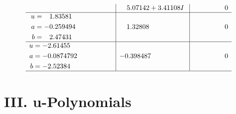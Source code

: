 \documentclass[1p]{elsarticle_modified}
\theoremstyle{definition}
\begin{document}
$$\begin{array}{c|c|c}
 & \phantom{-}5.07142 + 3.41108 I & \phantom{-0.000000 } 0 \\ \hline\begin{aligned}
u &= \phantom{-}1.83581\phantom{ +0.000000I} \\
a &= -0.259494\phantom{ +0.000000I} \\
b &= \phantom{-}2.47431\phantom{ +0.000000I}\end{aligned}
 & \phantom{-}1.32808\phantom{ +0.000000I} & \phantom{-0.000000 } 0 \\ \hline\begin{aligned}
u &= -2.61455\phantom{ +0.000000I} \\
a &= -0.0874792\phantom{ +0.000000I} \\
b &= -2.52384\phantom{ +0.000000I}\end{aligned}
 & -0.398487\phantom{ +0.000000I} & \phantom{-0.000000 } 0\\
 \hline 
 \end{array}$$\newpage
\newpage\renewcommand{\arraystretch}{1}
\centering \section*{ III. u-Polynomials}
\end{document}
